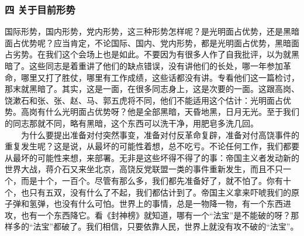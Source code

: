 \documentclass[cn,11pt,chinese]{elegantbook}
\def\myformat#1{\hfil\hfil #1}
\begin{document}
\subsubsection*{\myformat{四 关于目前形势}}
国际形势，国内形势，党内形势，这三种形势怎样呢？是光明面占优势，还是黑暗面占优势呢？应当肯定，不论国际、国内、党内形势，都是光明面占优势，黑暗面占劣势。在我们这个会场上也是如此。不要因为有很多人作了自我批评，以为就黑暗了。这些同志是着重讲了他们的缺点错误，没有讲他们的长处，哪一年参加革命，哪里又打了胜仗，哪里有工作成绩，这些话都没有讲。专看他们这一篇检讨，那末就黑暗了。其实，这是一面，在很多同志身上，这是次要的一面。这跟高岗、饶漱石和张、张、赵、马、郭五虎将不同，他们不能适用这个估计：光明面占优势。高岗有什么光明面占优势呀？他是全部黑暗，天昏地黑，日月无光。至于我们的同志那就不同，略有黑暗，这个东西可以洗干净，用肥皂多洗几回。\\
　　为什么要提出准备对付突然事变，准备对付反革命复辟，准备对付高饶事件的重复发生呢？这是说，从最坏的可能性着想，总不吃亏。不论任何工作，我们都要从最坏的可能性来想，来部署。无非是这些坏得不得了的事：帝国主义者发动新的世界大战，蒋介石又来坐北京，高饶反党联盟一类的事件重新发生，而且不只一个，而是十个，一百个。尽管有那么多，我们都先准备好了，就不怕了。你有十个，也只有五双，没有什么了不起，我们都估计到了。帝国主义拿来吓唬我们的原子弹和氢弹，也没有什么可怕。世界上的事情，总是一物降一物，有一个东西进攻，也有一个东西降它。看《封神榜》就知道，哪有一个“法宝”是不能破的呀？那样多的“法宝”都破了。我们相信，只要依靠人民，世界上就没有攻不破的“法宝”。\\
\end{document}
